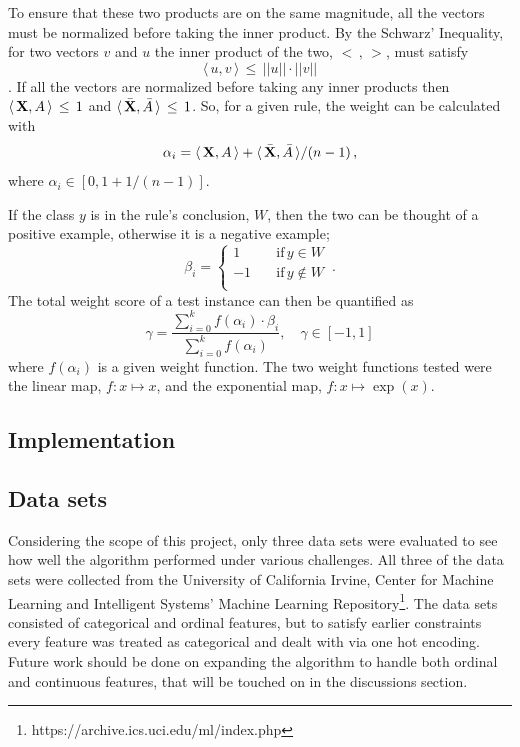 \documentclass[10pt]{article}
\begin{document}
To ensure that these two products are on the same magnitude, all the vectors must be normalized before taking the inner product. By the Schwarz' Inequality, for two vectors $v$ and $u$ the inner product of the two, $< \, , \, >$, must satisfy 
\[\langle \,u, v \, \rangle \, \leq \,  ||u|| \cdot ||v||\]
\citep{strang2006linear}. If all the vectors are normalized before taking any inner products then $\langle \,\vb{X}, A \, \rangle \,\leq\, 1$ and $\langle \, \bar{\vb{X}}, \bar{A} \, \rangle \, \leq \, 1$. So, for a given rule, the weight can be calculated with 
\[\alpha_i = \langle \,\vb{X}, A \, \rangle + \langle \, \bar{\vb{X}}, \bar{A} \, \rangle / (n-1) \, ,\]
where $\alpha_i \in [0, 1+ 1/(n-1)]$.

If the class $y$ is in the rule's conclusion, $W$, then the two can be thought of a positive example, otherwise it is a negative example;
\begin{equation*}
\beta_i=\begin{cases}
          1 \quad &\text{if} \, y \in W \\
          -1 \quad &\text{if} \, y \notin W\\
     \end{cases} \, .
\end{equation*}
The total weight score of a test instance can then be quantified as 
\begin{equation}
\gamma = \frac{\sum\limits_{i=0}^k f(\alpha_i) \cdot \beta_i}{\sum\limits_{i=0}^k f(\alpha_i)},  \quad \gamma \in [-1, 1]
\label{eq:rule_meas}
\end{equation}
where $f(\alpha_i)$ is a given weight function. The two weight functions tested were the linear map, $f: x\mapsto x$, and the exponential map, $f: x\mapsto \exp(x)$. 


\subsection{Implementation}

\subsection{Data sets}
Considering the scope of this project, only three data sets were evaluated to see how well  the algorithm performed under various challenges. All three of the data sets were collected from the University of California Irvine, Center for Machine Learning and Intelligent Systems' Machine Learning Repository\footnote{https://archive.ics.uci.edu/ml/index.php}. The data sets consisted of categorical and ordinal features, but to satisfy earlier constraints every feature was treated as categorical and dealt with via one hot encoding. Future work should be done on expanding the algorithm to handle both ordinal and continuous features, that will be touched on in the discussions section.
\end{document}
